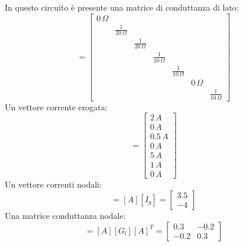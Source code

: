 \documentclass{article}
\numberwithin{equation}{subsection}
\begin{document}
In questo circuito è presente una matrice di conduttanza di lato:
\begin{equation*}
    [G_l]=\begin{bmatrix}
        0\,\Omega&&&&&&\\
        &\displaystyle\frac{1}{20\,\Omega}&&&&&\\
        &&\displaystyle\frac{1}{20\,\Omega}&&&&\\
        &&&\displaystyle\frac{1}{10\,\Omega}&&&\\
        &&&&\displaystyle\frac{1}{10\,\Omega}&&\\
        &&&&&0\,\Omega&\\
        &&&&&&\displaystyle\frac{1}{10\,\Omega}
    \end{bmatrix}
\end{equation*}
Un vettore corrente erogata:
\begin{equation*}
    [I_g]=\begin{bmatrix}
        2\,A\\
        0\,A\\
        0.5\,A\\
        0\,A\\
        5\,A\\
        1\,A\\
        0\,A
    \end{bmatrix}
\end{equation*}
Un vettore correnti nodali:
\begin{equation*}
    [I_{no}]=[A][I_g]=\begin{bmatrix}
        3.5\\
        -4
    \end{bmatrix}
\end{equation*}
Una matrice conduttanza nodale:
\begin{equation*}
    [G_{no}]=[A][G_l][A]^T=\begin{bmatrix}
        0.3&-0.2\\
        -0.2&0.3
    \end{bmatrix}
\end{equation*}
\end{document}

